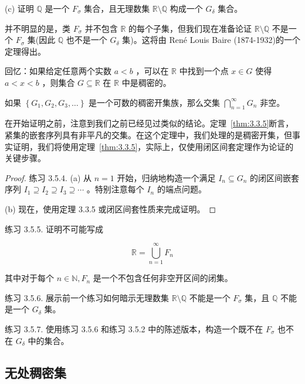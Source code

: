 (c) 证明 \(\mathbb{Q}\) 是一个 \({F}_{\sigma }\) 集合，且无理数集 \(\mathbb{R}\setminus\mathbb{Q}\) 构成一个 \({G}_{\delta }\) 集合。

并不明显的是，类 \({F}_{\sigma }\) 并不包含 \(\mathbb{R}\) 的每个子集，但我们现在准备论证 \(\mathbb{R}\setminus\mathbb{Q}\) 不是一个 \({F}_{\sigma }\) 集(因此 \(\mathbb{Q}\) 也不是一个 \({G}_{\delta }\) 集)。这将由 René Louis Baire (1874-1932)的一个定理得出。

回忆：如果给定任意两个实数 \(a < b\) ，可以在 \(\mathbb{R}\) 中找到一个点 \(x \in  G\) 使得 \(a < x < b\) ，则集合 \(G \subseteq  \mathbb{R}\) 在 \(\mathbb{R}\) 中是稠密的。

\begin{Thm}
  \label{thm:3.5.2}
  如果 \(\left\{  {{G}_{1},{G}_{2},{G}_{3},\ldots }\right\}\) 是一个可数的稠密开集族，那么交集 \(\mathop{\bigcap }\limits_{{n = 1}}^{\infty }{G}_{n}\) 非空。
\end{Thm}

在开始证明之前，注意到我们之前已经见过类似的结论。定理~\ref{thm:3.3.5}断言，紧集的嵌套序列具有非平凡的交集。在这个定理中，我们处理的是稠密开集，但事实证明，我们将使用定理~\ref{thm:3.3.5}，实际上，仅使用闭区间套定理作为论证的关键步骤。

\begin{proof}
  练习 3.5.4. (a) 从 \(n = 1\) 开始，归纳地构造一个满足 \({I}_{n} \subseteq  {G}_{n}\) 的闭区间嵌套序列 \({I}_{1} \supseteq  {I}_{2} \supseteq  {I}_{3} \supseteq  \cdots\) 。特别注意每个 \({I}_{n}\) 的端点问题。

(b) 现在，使用定理 3.3.5 或闭区间套性质来完成证明。
\end{proof}

练习 3.5.5. 证明不可能写成

\[
\mathbb{R} = \mathop{\bigcup }\limits_{{n = 1}}^{\infty }{F}_{n}
\]

其中对于每个 \(n \in  \mathbb{N},{F}_{n}\) 是一个不包含任何非空开区间的闭集。

练习 3.5.6. 展示前一个练习如何暗示无理数集 \(\mathbb{R}\setminus\mathbb{Q}\) 不能是一个 \({F}_{\sigma }\) 集，且 \(\mathbb{Q}\) 不能是一个 \({G}_{\delta }\) 集。

练习 3.5.7. 使用练习 3.5.6 和练习 3.5.2 中的陈述版本，构造一个既不在 \({F}_{\sigma }\) 也不在 \({G}_{\delta }\) 中的集合。

\subsection{无处稠密集}

